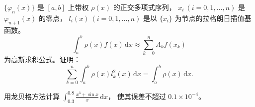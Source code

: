 \documentclass[fontset=exam]{exam-zh}
\begin{document}
\begin{question}[index=6]
$\{\varphi_n(x)\}$ 是 $[a,b]$ 上带权 $\rho(x)$ 的正交多项式序列，
$x_i\ (i=0,1,\ldots,n)$ 是 $\varphi_{n+1}(x)$ 的零点，
$l_i(x)\ (i=0,1,\ldots,n)$ 是以 $\{x_i\}$ 为节点的拉格朗日插值基函数。
\[
\int_a^b\rho(x)f(x)\,\mathrm{d}x\approx\sum_{k=0}^{n}A_kf(x_k)
\]
为高斯求积公式。证明：
\[
\sum_{k=0}^{n}\int_a^b\rho(x)l_k^2(x)\,\mathrm{d}x
=\int_a^b\rho(x)\,\mathrm{d}x.
\]
\end{question}

\begin{question}[index=7]
用龙贝格方法计算 $\displaystyle\int_{0.3}^{0.8}\frac{x^3+\sin x}{x}\,\mathrm{d}x$，
使其误差不超过 $0.1\times10^{-4}$。
\end{question}
\end{document}
